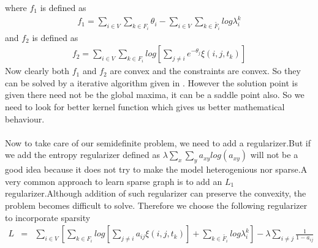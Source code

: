 where $f_1$ is defined as 
\begin{eqnarray*}
f_1 = \displaystyle\sum_{i \in V}\displaystyle\sum_{k \in F_i}\theta_i-\displaystyle\sum_{i \in V}\displaystyle\sum_{k \in \widetilde{F_{i}}}log\lambda_{i}^{k}
\end{eqnarray*}
and $f_2$ is defined as
\begin{eqnarray*}
f_2 = \displaystyle\sum_{i \in V}\displaystyle\sum_{k \in F_i}log[\displaystyle\sum_{j \neq i} e^{-\theta_j}\xi (i,j,t_k)]
\end{eqnarray*}
Now clearly both $f_1$ and $f_2$ are convex and the constraints are convex. So they can be solved by a iterative algorithm given in \cite{cccp}. However the solution point is given there need not be the global maxima, it can be a saddle point also. So we need to look for better kernel function which gives us better mathematical behaviour.
\\
\\ Now to take care of our semidefinite problem, we need to add a regularizer.But if we add the entropy regularizer defined as $\lambda \displaystyle\sum_x \displaystyle\sum_y a_{xy}log(a_{xy})$ will not be a good idea because it does not try to make the model heterogenious nor sparse.A very common approach to learn sparse graph is to add an $L_1$ regularizer.Although addition of such regularizer can preserve the convexity, the problem becomes difficult to solve. Therefore we choose the following regularizer to incorporate sparsity
\begin{eqnarray*}
L &=& \displaystyle\sum_{i \in V}[\displaystyle\sum_{k \in F_i}log[\displaystyle\sum_{j \neq i} a_{ij}\xi (i,j,t_k)]+\displaystyle\sum_{k \in \widetilde{F_{i}}}log\lambda_{i}^{k}] - \lambda \displaystyle\sum_{i \neq j} \frac{1}{1 - a_{ij}}
\end{eqnarray*}